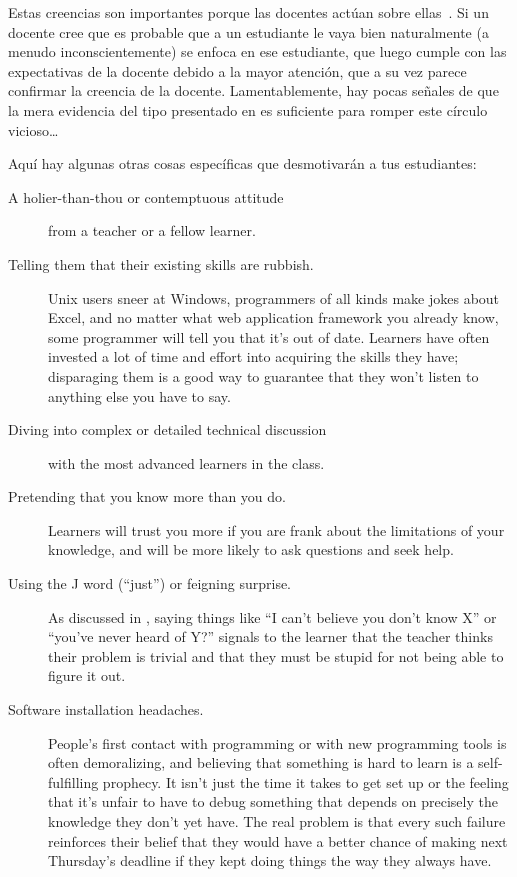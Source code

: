 Estas creencias son importantes porque las docentes actúan sobre ellas~\cite{Brop1983}.
Si un docente cree que es probable que a un estudiante le vaya bien
naturalmente (a menudo inconscientemente) se enfoca en ese estudiante,
que luego cumple con las expectativas de la docente debido a la mayor atención,
que a su vez parece confirmar la creencia de la docente.
Lamentablemente,
hay pocas señales de que la mera evidencia del tipo presentado en \cite{Pati2016}
es suficiente para romper este círculo vicioso{\ldots}

Aquí hay algunas otras cosas específicas que desmotivarán a tus estudiantes:

\begin{description}

\item[A holier-than-thou or contemptuous attitude]
  from a teacher or a fellow learner.

\item[Telling them that their existing skills are rubbish.]
  Unix users sneer at Windows,
  programmers of all kinds make jokes about Excel,
  and no matter what web application framework you already know,
  some programmer will tell you that it's out of date.
  Learners have often invested a lot of time and effort into acquiring the skills they have;
  disparaging them is a good way to guarantee that
  they won't listen to anything else you have to say.

\item[Diving into complex or detailed technical discussion]
  with the most advanced learners in the class.

\item[Pretending that you know more than you do.]
  Learners will trust you more if you are frank about the limitations of your knowledge,
  and will be more likely to ask questions and seek help.

\item[Using the J word (``just'') or feigning surprise.]
  As discussed in ,
  saying things like ``I can't believe you don't know X'' or ``you've never heard of Y?''
  signals to the learner that
  the teacher thinks their problem is trivial
  and  that they must be stupid for not being able to figure it out.

\item[Software installation headaches.]
  People's first contact with programming or with new programming tools is often demoralizing,
  and believing that something is hard to learn is a self-fulfilling prophecy.
  It isn't just the time it takes to get set up
  or the feeling that it's unfair to have to debug something that depends on
  precisely the knowledge they don't yet have.
  The real problem is that every such failure reinforces their belief that
  they would have a better chance of making next Thursday's deadline
  if they kept doing things the way they always have.

\end{description}

